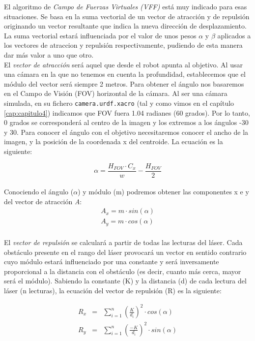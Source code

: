 El algoritmo de \textit{Campo de Fuerzas Virtuales (VFF)} está muy indicado para esas situaciones. Se basa en la suma vectorial de un vector de atracción y de repulsión originando un vector resultante que indica la nueva dirección de desplazamiento. La suma vectorial estará influenciada por el valor de unos pesos $\alpha$ y $\beta$ aplicados a los vectores de atraccion y repulsión respectivamente, pudiendo de esta manera dar más valor a uno que otro.\\

El \textit{vector de atracción} será aquel que desde el robot apunta al objetivo. Al usar una cámara en la que no tenemos en cuenta la profundidad, establecemos que el módulo del vector será siempre 2 metros. Para obtener el ángulo nos basaremos en el Campo de Visión (FOV) horizontal de la cámara. Al ser una cámara simulada, en su fichero \texttt{camera.urdf.xacro} (tal y como vimos en el capítulo \ref{cap:capitulo4}) indicamos que FOV fuera 1.04 radianes (60 grados). Por lo tanto, 0 grados se corresponderá al centro de la imagen y los extremos a los ángulos -30 y 30. Para conocer el ángulo con el objetivo necesitaremos conocer el ancho de la imagen, y la posición de la coordenada x del centroide. La ecuación es la siguiente:

\begin{equation*}
\alpha = \frac{H_{FOV} \cdot C_{x}}{w} - \frac{H_{FOV}}{2}
\end{equation*}\\

Conociendo el ángulo ($\alpha$) y módulo (m) podremos obtener las componentes x e y del vector de atracción \textit{A}:
\begin{eqnarray*}
A_x = m \cdot sin(\alpha)\\
A_y = m \cdot cos(\alpha)\\
\end{eqnarray*}

El \textit{vector de repulsión} se calculará a partir de todas las lecturas del láser. Cada obstáculo presente en el rango del láser provocará un vector en sentido contrario cuyo módulo estará influenciado por una constante y será inversamente proporcional a la distancia con el obstáculo (es decir, cuanto más cerca, mayor será el módulo). Sabiendo la constante (K) y la distancia (d) de cada lectura del láser (n lecturas), la ecuación del vector de repulsión (R) es la siguiente:

\begin{eqnarray*}
R_x &=& \sum_{i=1}^n\left(\frac{K}{d_i}\right)^2 \cdot cos(\alpha)\\
R_y &=& \sum_{i=1}^n\left(\frac{-K}{d_i}\right)^2 \cdot sin(\alpha)\\
\end{eqnarray*}

